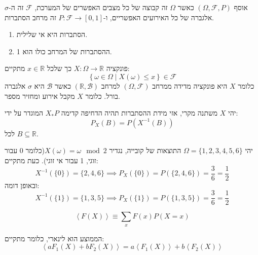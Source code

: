 \documentclass{tstextbook}
\begin{document}
\begin{definition}
אוסף \(\left( \Omega,\mathcal{F},P \right)\) כאשר \(\Omega\) זה קבוצה של כל מצבים האפשרים של המערכת, \(\mathcal{F}\) זה ה-\(\sigma\) אלגברה של כל האירועים האפשריים, ו-\(P:\mathcal{F}\to[0,1]\) זה מרחב הסתברות.

\end{definition}
\begin{proposition}
  \begin{enumerate}
    \item הסתברות היא אי שלילית. 


    \item ההסתברות של המרחב כולו הוא 1. 


  \end{enumerate}
\end{proposition}
\begin{definition}
פונקציה \(X:\Omega\to \mathbb{R}\) כך שלכל \(x \in \mathbb{R}\) מתקיים:
$$\left\{  \omega \in \Omega \mid X\left( \omega \right)\leq x  \right\}\in \mathcal{F} $$
כלומר \(X\) היא פונקציה מדידה ממרחב \(\left( \Omega,\mathcal{F} \right)\) למרחב \(\left( \mathbb{R},\mathcal{B} \right)\) כאשר \(\mathcal{B}\) היא \(\sigma\) אלגברה בורל. כלומר \(X\) מקבל אירוע ומחזיר מספר.

\end{definition}
\begin{definition}
יהי \(X\) משתנה מקרי, אזי מידת ההסתברות תהיה הדחיפה קדימה \(X_{*}P\) המוגדר על ידי:
$$P_{X}(B)=P(X^{-1}(B))$$
לכל \(B \subseteq \mathbb{R}\). 

\end{definition}
\begin{example}
יהי \(\Omega=\{ 1,2,3,4,5,6 \}\) התוצאות של קובייה, נגדיר \(X\left( \omega \right)=\omega \mod 2\)(כלומר 0 עבור זוגי, 1 עבור אי זוגי). כעת מתקיים:
$$X^{-1}\left( \{0\} \right)=\{2,4,6\}\implies P_{X}\left( \{ 0 \} \right)=P\left( \{ 2,4,6 \} \right)=\frac{3}{6}=\frac{1}{2}$$
ובאופן דומה:
$$X ^{-1}\left( \{ 1 \} \right)=\{ 1,3,5 \}\implies P_{X}\left( \{ 1 \} \right)=P\left( \{ 1,3,5 \} \right)=\frac{3}{6}=\frac{1}{2}$$

\end{example}
\begin{definition}
$$\left\langle F\left(X\right)\right\rangle\equiv\sum_{x}F\left(x\right)P\left(X=x\right)$$

\end{definition}
\begin{proposition}
הממוצע הוא לינארי, כלומר מתקיים:
$$\left\langle a F_{1}\left(X\right)+b F_{2}\left(X\right)\right\rangle=a\left\langle F_{1}\left(X\right)\right\rangle+b\left\langle F_{2}\left(X\right)\right\rangle$$

\end{proposition}
\end{document}
